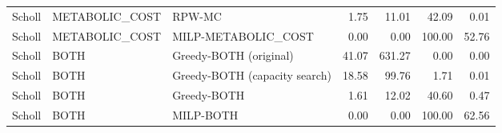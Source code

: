 \begin{tabular}{lllrrrr}
Scholl & METABOLIC\_COST & RPW-MC & 1.75 & 11.01 & 42.09 & 0.01 \\
Scholl & METABOLIC\_COST & MILP-METABOLIC_COST & 0.00 & 0.00 & 100.00 & 52.76 \\
Scholl & BOTH & Greedy-BOTH (original) & 41.07 & 631.27 & 0.00 & 0.00 \\
Scholl & BOTH & Greedy-BOTH (capacity search) & 18.58 & 99.76 & 1.71 & 0.01 \\
Scholl & BOTH & Greedy-BOTH & 1.61 & 12.02 & 40.60 & 0.47 \\
Scholl & BOTH & MILP-BOTH & 0.00 & 0.00 & 100.00 & 62.56 \\
\bottomrule
\end{tabular}

